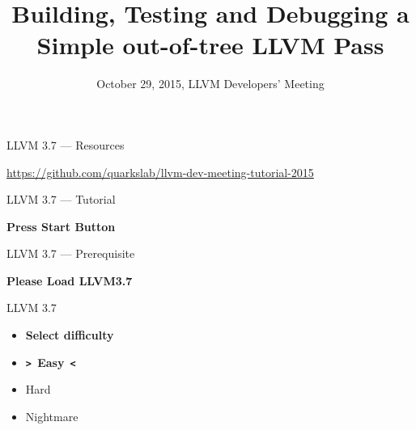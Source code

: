 \documentclass[14pt]{beamer}
\title{Building, Testing and Debugging a Simple out-of-tree LLVM Pass}
\date{October 29, 2015, LLVM Developers' Meeting}
\begin{document}
{
	\begin{frame}
        \maketitle
	\end{frame}
}


    \begin{frame}{LLVM 3.7 --- Resources}
        \begin{center}
            \url{https://github.com/quarkslab/llvm-dev-meeting-tutorial-2015}
        \end{center}
    \end{frame}


    \begin{frame}{LLVM 3.7 --- Tutorial}
        \begin{center}
            \textbf{\Large Press Start Button}
        \end{center}
    \end{frame}

    \begin{frame}{LLVM 3.7 --- Prerequisite}
        \begin{center}
            \textbf{\Large Please Load LLVM3.7}
        \end{center}
    \end{frame}

    \begin{frame}{LLVM 3.7}
        \begin{center}
            \begin{itemize}
                \centering
                \item[]\alert{\bf Select difficulty}\vspace{1em}
                \item[] \textbf{\texttt{>~}Easy\texttt{~<}}
                \item[] Hard
                \item[] Nightmare
            \end{itemize}
        \end{center}
    \end{frame}
\end{document}
